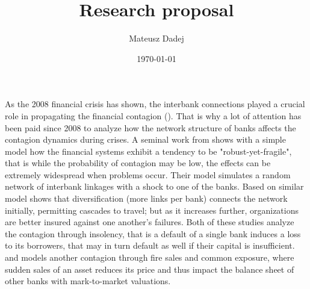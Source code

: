 \documentclass{article}
\title{Research proposal}
\author{Mateusz Dadej}
\date{\today}
\begin{document}
\maketitle
As the 2008 financial crisis has shown, the interbank connections played a crucial role in propagating the financial contagion (\citet{bruner}). That is why a lot of attention has been paid since 2008 to analyze how the network structure of banks affects the contagion dynamics during crises. A seminal work from \citet{gai} shows with a simple model how the financial systems exhibit a tendency to be "robust-yet-fragile", that is while the probability of contagion may be low, the effects can be extremely widespread
when problems occur. Their model simulates a random network of interbank linkages with a shock to one of the banks. Based on similar model \citet{elliot} shows that diversification (more links per bank) connects the network initially, permitting cascades to travel; but as it increases further, organizations are better insured against one another's failures. Both of these studies analyze the contagion through insolency, that is a default of a single bank induces a loss to its borrowers, that may in turn default as well if their capital is insufficient. \citet{Greenwood} and \citet{cifuentes} models another contagion through fire sales and common exposure, where sudden sales of an asset reduces its price and thus impact the balance sheet of other banks with mark-to-market valuations.
\end{document}
